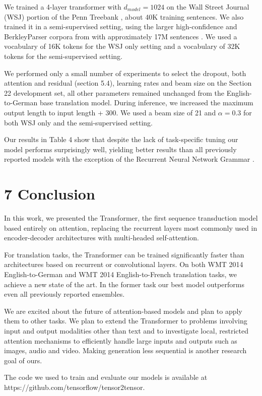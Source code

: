 \documentclass[conference]{IEEEtran}
\begin{document}
We trained a 4-layer transformer with $d_{model} = 1024$ on the Wall Street Journal (WSJ) portion of the Penn Treebank \cite{ref25}, about 40K training sentences. We also trained it in a semi-supervised setting, using the larger high-confidence and BerkleyParser corpora from with approximately 17M sentences \cite{ref37}. We used a vocabulary of 16K tokens for the WSJ only setting and a vocabulary of 32K tokens for the semi-supervised setting.

We performed only a small number of experiments to select the dropout, both attention and residual (section 5.4), learning rates and beam size on the Section 22 development set, all other parameters remained unchanged from the English-to-German base translation model. During inference, we increased the maximum output length to input length + 300. We used a beam size of 21 and $\alpha = 0.3$ for both WSJ only and the semi-supervised setting.

Our results in Table 4 show that despite the lack of task-specific tuning our model performs surprisingly well, yielding better results than all previously reported models with the exception of the Recurrent Neural Network Grammar \cite{ref8}.

\section{7 Conclusion}

In this work, we presented the Transformer, the first sequence transduction model based entirely on attention, replacing the recurrent layers most commonly used in encoder-decoder architectures with multi-headed self-attention.

For translation tasks, the Transformer can be trained significantly faster than architectures based on recurrent or convolutional layers. On both WMT 2014 English-to-German and WMT 2014 English-to-French translation tasks, we achieve a new state of the art. In the former task our best model outperforms even all previously reported ensembles.

We are excited about the future of attention-based models and plan to apply them to other tasks. We plan to extend the Transformer to problems involving input and output modalities other than text and to investigate local, restricted attention mechanisms to efficiently handle large inputs and outputs such as images, audio and video. Making generation less sequential is another research goal of ours.

The code we used to train and evaluate our models is available at https://github.com/tensorflow/tensor2tensor.
\end{document}

